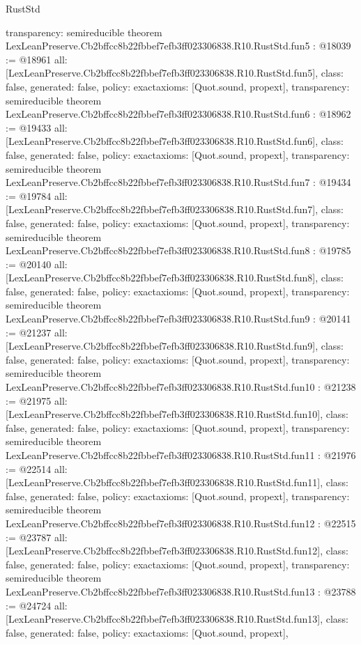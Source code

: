 \begin{lexlean}{RustStd}
\begin{coremodule}
{  transparency: semireducible
}
theorem LexLeanPreserve.Cb2bffcc8b22fbbef7efb3ff023306838.R10.RustStd.fun5 : @18039 := @18961 {
  all: [LexLeanPreserve.Cb2bffcc8b22fbbef7efb3ff023306838.R10.RustStd.fun5],
  class: false,
  generated: false,
  policy: exact{axioms: [Quot.sound, propext]},
  transparency: semireducible
}
theorem LexLeanPreserve.Cb2bffcc8b22fbbef7efb3ff023306838.R10.RustStd.fun6 : @18962 := @19433 {
  all: [LexLeanPreserve.Cb2bffcc8b22fbbef7efb3ff023306838.R10.RustStd.fun6],
  class: false,
  generated: false,
  policy: exact{axioms: [Quot.sound, propext]},
  transparency: semireducible
}
theorem LexLeanPreserve.Cb2bffcc8b22fbbef7efb3ff023306838.R10.RustStd.fun7 : @19434 := @19784 {
  all: [LexLeanPreserve.Cb2bffcc8b22fbbef7efb3ff023306838.R10.RustStd.fun7],
  class: false,
  generated: false,
  policy: exact{axioms: [Quot.sound, propext]},
  transparency: semireducible
}
theorem LexLeanPreserve.Cb2bffcc8b22fbbef7efb3ff023306838.R10.RustStd.fun8 : @19785 := @20140 {
  all: [LexLeanPreserve.Cb2bffcc8b22fbbef7efb3ff023306838.R10.RustStd.fun8],
  class: false,
  generated: false,
  policy: exact{axioms: [Quot.sound, propext]},
  transparency: semireducible
}
theorem LexLeanPreserve.Cb2bffcc8b22fbbef7efb3ff023306838.R10.RustStd.fun9 : @20141 := @21237 {
  all: [LexLeanPreserve.Cb2bffcc8b22fbbef7efb3ff023306838.R10.RustStd.fun9],
  class: false,
  generated: false,
  policy: exact{axioms: [Quot.sound, propext]},
  transparency: semireducible
}
theorem LexLeanPreserve.Cb2bffcc8b22fbbef7efb3ff023306838.R10.RustStd.fun10 : @21238 := @21975 {
  all: [LexLeanPreserve.Cb2bffcc8b22fbbef7efb3ff023306838.R10.RustStd.fun10],
  class: false,
  generated: false,
  policy: exact{axioms: [Quot.sound, propext]},
  transparency: semireducible
}
theorem LexLeanPreserve.Cb2bffcc8b22fbbef7efb3ff023306838.R10.RustStd.fun11 : @21976 := @22514 {
  all: [LexLeanPreserve.Cb2bffcc8b22fbbef7efb3ff023306838.R10.RustStd.fun11],
  class: false,
  generated: false,
  policy: exact{axioms: [Quot.sound, propext]},
  transparency: semireducible
}
theorem LexLeanPreserve.Cb2bffcc8b22fbbef7efb3ff023306838.R10.RustStd.fun12 : @22515 := @23787 {
  all: [LexLeanPreserve.Cb2bffcc8b22fbbef7efb3ff023306838.R10.RustStd.fun12],
  class: false,
  generated: false,
  policy: exact{axioms: [Quot.sound, propext]},
  transparency: semireducible
}
theorem LexLeanPreserve.Cb2bffcc8b22fbbef7efb3ff023306838.R10.RustStd.fun13 : @23788 := @24724 {
  all: [LexLeanPreserve.Cb2bffcc8b22fbbef7efb3ff023306838.R10.RustStd.fun13],
  class: false,
  generated: false,
  policy: exact{axioms: [Quot.sound, propext]},
}
\end{coremodule}
\end{lexlean}
